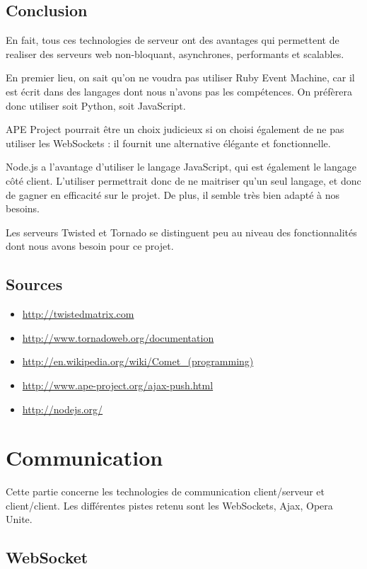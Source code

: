 \documentclass[a4paper,10pt]{report}
\begin{document}
  \section{Conclusion}
  
En fait, tous ces technologies de serveur ont des avantages qui permettent de realiser des serveurs web non-bloquant, asynchrones, performants et scalables. 

En premier lieu, on sait qu'on ne voudra pas utiliser Ruby Event Machine, car il est écrit dans des langages dont nous n'avons pas les compétences. On préfèrera donc utiliser soit Python, soit JavaScript. 

APE Project pourrait être un choix judicieux si on choisi également de ne pas utiliser les WebSockets : il fournit une alternative élégante et fonctionnelle. 

Node.js a l'avantage d'utiliser le langage JavaScript, qui est également le langage côté client. L'utiliser permettrait donc de ne maitriser qu'un seul langage, et donc de gagner en efficacité sur le projet. De plus, il semble très bien adapté à nos besoins. 

Les serveurs Twisted et Tornado se distinguent peu au niveau des fonctionnalités dont nous avons besoin pour ce projet. 

  \section{Sources}

    \begin{itemize}
    \item \url{http://twistedmatrix.com}
    \item \url{http://www.tornadoweb.org/documentation}
    \item \url{http://en.wikipedia.org/wiki/Comet_(programming)}
    \item \url{http://www.ape-project.org/ajax-push.html}
    \item \url{http://nodejs.org/}
    \end{itemize}


\chapter{Communication}

Cette partie concerne les technologies de communication client/serveur et 
client/client. Les différentes pistes retenu sont les WebSockets, Ajax, 
Opera Unite.

  \section{WebSocket}
\end{document}
